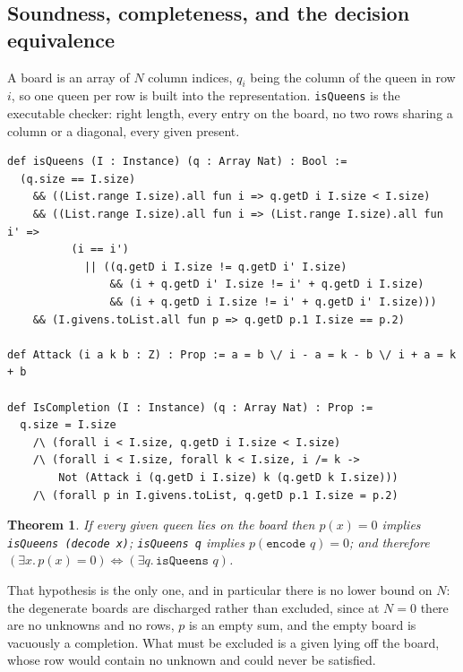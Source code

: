 \documentclass{easychair}
\newtheorem{thm}{Theorem}[section]
\begin{document}
\subsection{Soundness, completeness, and the decision equivalence}

A board is an array of $N$ column indices, $q_i$ being the column of the queen in row $i$, so one
queen per row is built into the representation. \lstinline{isQueens} is the executable checker: right
length, every entry on the board, no two rows sharing a column or a diagonal, every given present.

\begin{lstlisting}[caption={The executable checker, and the condition it is proved to decide.},label={lst:spec}]
def isQueens (I : Instance) (q : Array Nat) : Bool :=
  (q.size == I.size)
    && ((List.range I.size).all fun i => q.getD i I.size < I.size)
    && ((List.range I.size).all fun i => (List.range I.size).all fun i' =>
          (i == i')
            || ((q.getD i I.size != q.getD i' I.size)
                && (i + q.getD i' I.size != i' + q.getD i I.size)
                && (i + q.getD i I.size != i' + q.getD i' I.size)))
    && (I.givens.toList.all fun p => q.getD p.1 I.size == p.2)

def Attack (i a k b : Z) : Prop := a = b \/ i - a = k - b \/ i + a = k + b

def IsCompletion (I : Instance) (q : Array Nat) : Prop :=
  q.size = I.size
    /\ (forall i < I.size, q.getD i I.size < I.size)
    /\ (forall i < I.size, forall k < I.size, i /= k ->
        Not (Attack i (q.getD i I.size) k (q.getD k I.size)))
    /\ (forall p in I.givens.toList, q.getD p.1 I.size = p.2)
\end{lstlisting}

\begin{thm}\label{thm:iff}
If every given queen lies on the board then $p(x) = 0$ implies \lstinline{isQueens (decode x)};
\lstinline{isQueens q} implies $p(\texttt{encode }q) = 0$; and therefore
$(\exists x.\,p(x)=0) \iff (\exists q.\,\texttt{isQueens }q)$.
\end{thm}

That hypothesis is the only one, and in particular there is no lower bound on $N$: the degenerate
boards are discharged rather than excluded, since at $N = 0$ there are no unknowns and no rows, $p$
is an empty sum, and the empty board is vacuously a completion. What must be excluded is a given lying
off the board, whose row would contain no unknown and could never be satisfied.
\end{document}

